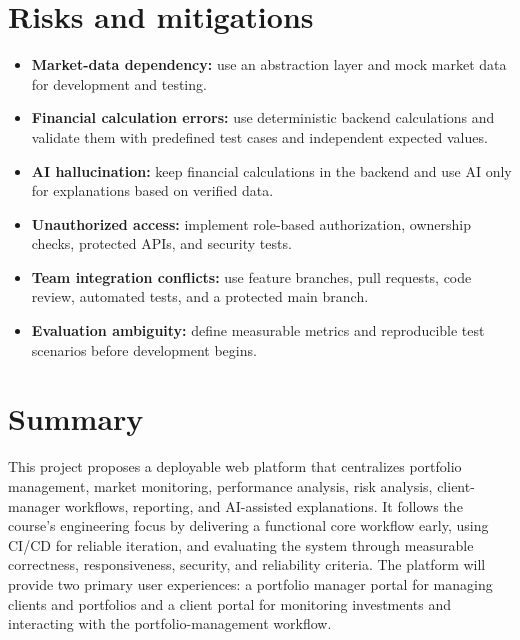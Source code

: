 \documentclass[11pt,a4paper]{article}
\begin{document}
\section{Risks and mitigations}
\begin{itemize}[leftmargin=0.7cm]
\item \textbf{Market-data dependency:} use an abstraction layer and mock market data for development and testing.
\item \textbf{Financial calculation errors:} use deterministic backend calculations and validate them with predefined test cases and independent expected values.
\item \textbf{AI hallucination:} keep financial calculations in the backend and use AI only for explanations based on verified data.
\item \textbf{Unauthorized access:} implement role-based authorization, ownership checks, protected APIs, and security tests.
\item \textbf{Team integration conflicts:} use feature branches, pull requests, code review, automated tests, and a protected main branch.
\item \textbf{Evaluation ambiguity:} define measurable metrics and reproducible test scenarios before development begins.
\end{itemize}

\section{Summary}
This project proposes a deployable web platform that centralizes portfolio management, market monitoring, performance analysis, risk analysis, client-manager workflows, reporting, and AI-assisted explanations. It follows the course's engineering focus by delivering a functional core workflow early, using CI/CD for reliable iteration, and evaluating the system through measurable correctness, responsiveness, security, and reliability criteria. The platform will provide two primary user experiences: a portfolio manager portal for managing clients and portfolios and a client portal for monitoring investments and interacting with the portfolio-management workflow.
\end{document}
